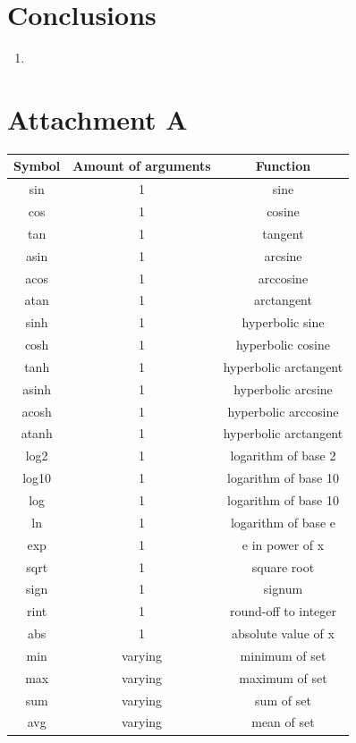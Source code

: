 \documentclass[11pt]{article}
\begin{document}
	\newpage
	\section{Conclusions}
	
	\begin{enumerate}
		\item
	\end{enumerate}
	
	\newpage	
	\section*{Attachment A}
	
	\begin{center}
	\begin{tabular}{| c | c | c |}
		\hline
		\textbf{Symbol} & \textbf{Amount of arguments} & \textbf{Function}\\ \hline
		sin & 1 & sine\\ \hline
		cos & 1 & cosine\\ \hline
		tan & 1 & tangent\\ \hline
		asin & 1 & arcsine\\ \hline
		acos & 1 & arccosine\\ \hline
		atan & 1 & arctangent\\ \hline
		sinh & 1 & hyperbolic sine\\ \hline
		cosh & 1 & hyperbolic cosine \\ \hline
		tanh & 1 & hyperbolic arctangent\\ \hline
		asinh & 1 & hyperbolic arcsine\\ \hline
		acosh & 1 & hyperbolic arccosine \\ \hline
		atanh & 1 & hyperbolic arctangent\\ \hline
		log2 & 1 & logarithm of base 2\\ \hline
		log10 & 1 & logarithm of base 10 \\ \hline
		log & 1 & logarithm of base 10\\ \hline
		ln & 1 & logarithm of base e\\ \hline
		exp & 1 & e in power of x\\ \hline
		sqrt & 1 & square root\\ \hline
		sign & 1 & signum\\ \hline
		rint & 1 & round-off to integer\\ \hline
		abs & 1 & absolute value of x\\ \hline
		min & varying & minimum of set\\ \hline
		max & varying & maximum of set\\ \hline
		sum & varying & sum of set\\ \hline
		avg & varying & mean of set\\
		\hline
	\end{tabular}			
	\end{center}
	
\end{document}
